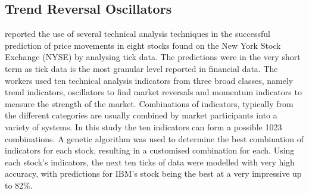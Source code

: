 \subsection{Trend Reversal Oscillators}
\cite{TanakaYamawaki2007125} reported the use of several technical analysis techniques in the successful prediction of price movements in eight stocks found on the New York Stock Exchange (NYSE) by analysing tick data. The predictions were in the very short term as tick data is the most granular level reported in financial data. The workers used ten technical analysis indicators from three broad classes, namely trend indicators, oscillators to find market reversals and momentum indicators to measure the strength of the market. Combinations of indicators, typically from the different categories are usually combined by market participants into a variety of systems. In this study the ten indicators can form a possible 1023 combinations. A genetic algorithm was used to determine the best combination of indicators for each stock, resulting in a customised combination for each. Using each stock's indicators, the next ten ticks of data were modelled with very high accuracy, with predictions for IBM's stock being the best at a very impressive up to 82\%. 



%

